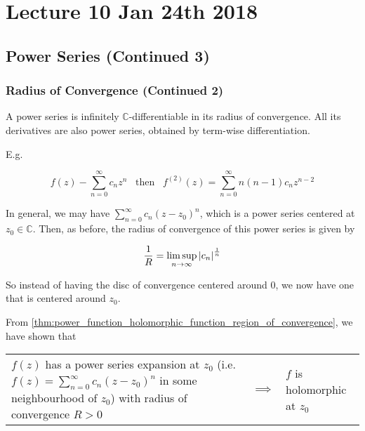 \documentclass[11pt, oneside]{book}
\begin{document}



\chapter{Lecture 10 Jan 24th 2018}
	\label{chapter:lecture_10_jan_24th_2018}

\section{Power Series (Continued 3)} %
\label{sec:power_series_continued_3}

\subsection{Radius of Convergence (Continued 2)} %
\label{sub:radius_of_convergence_continued_2}

A power series is infinitely $\mathbb{C}$-differentiable in its radius of convergence. All its derivatives are also power series, obtained by term-wise differentiation.

E.g.

\begin{equation*}
	f(z) - \sum_{n=0}^{\infty} c_n z^n \enspace \text{ then } \enspace f^{(2)}(z) = \sum_{n=0}^{\infty} n(n-1)c_n z^{n - 2}
\end{equation*}

In general, we may have $\sum_{n=0}^{\infty} c_n (z - z_0)^n$, which is a power series centered at $z_0 \in \mathbb{C}$. Then, as before, the radius of convergence of this power series is given by

\begin{equation*}
	\frac{1}{R} = \limsup_{n \to \infty} \left|c_n\right|^\frac{1}{n}
\end{equation*}

So instead of having the disc of convergence centered around $0$, we now have one that is centered around $z_0$.

\begin{crly}
	From \cref{thm:power_function_holomorphic_function_region_of_convergence}, we have shown that

	\begin{tabular}{L{7cm} C{2cm} R{5cm}}
		$f(z)$ has a power series expansion at $z_0$ (i.e. $f(z) = \sum_{n=0}^\infty c_n (z - z_0)^n$ in some neighbourhood of $z_0$) with radius of convergence $R > 0$ &
		$\implies$ &
		$f$ is holomorphic at $z_0$
	\end{tabular}
\end{crly}
\end{document}
